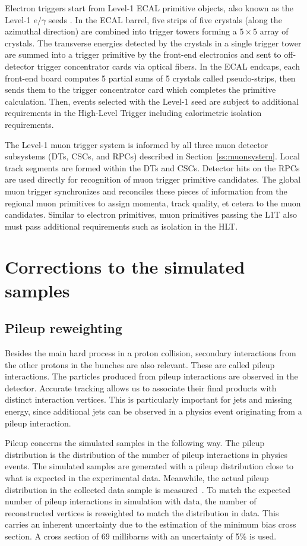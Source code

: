 Electron triggers start from Level-1 ECAL primitive objects,
also known as the Level-1 $e/\gamma$ seeds \cite{Khachatryan:2016bia}.
In the ECAL barrel, five strips of five crystals (along the azimuthal direction)
are combined into trigger towers forming a $5\times5$ array of crystals.
The transverse energies detected by the crystals in a single trigger tower are summed
into a trigger primitive by the front-end electronics and sent to off-detector
trigger concentrator cards via optical fibers. 
In the ECAL endcaps, each front-end board computes 5 partial sums of 5 crystals called pseudo-strips,
then sends them to the trigger concentrator card which completes the primitive calculation.
Then, events selected with the Level-1 seed are subject to additional requirements in
the High-Level Trigger including calorimetric isolation requirements.

The Level-1 muon trigger system is informed by all three muon detector subsystems (DTs, CSCs, and RPCs) described in Section~\ref{ss:muonsystem}.
Local track segments are formed within the DTs and CSCs.
Detector hits on the RPCs are used directly for recognition of muon trigger primitive candidates.
The global muon trigger synchronizes and reconciles these pieces of information
from the regional muon primitives to assign momenta, track quality, et cetera to the muon candidates.
Similar to electron primitives, muon primitives passing the L1T also must pass
additional requirements such as isolation in the HLT.

\section{Corrections to the simulated samples}
\subsection{Pileup reweighting}
\label{subsec:puweights}

Besides the main hard process in a proton collision, secondary interactions from the other protons in the bunches are also relevant.
These are called pileup interactions. 
The particles produced from pileup interactions are observed in the detector.
Accurate tracking allows us to associate their final products with distinct interaction vertices.
This is particularly important for jets and missing energy, since additional jets can be observed in a physics event originating from a pileup interaction.

Pileup concerns the simulated samples in the following way.
The pileup distribution is the distribution of the number of pileup interactions in physics events.
The simulated samples are generated with a pileup distribution close to what is expected in the experimental data.
Meanwhile, the actual pileup distribution in the collected data sample is measured~\cite{CMS:2017sdi}.
To match the expected number of pileup interactions in simulation with data,
the number of reconstructed vertices is reweighted to match the distribution in data.
This carries an inherent uncertainty due to the estimation of the minimum bias cross section.
A cross section of  69 millibarns with an uncertainty of 5\% is used.


